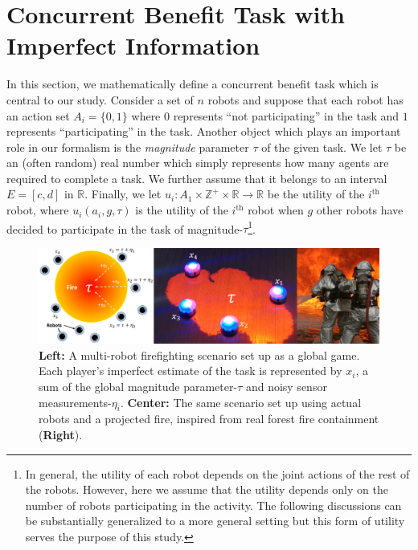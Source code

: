 \documentclass[conference]{ieeeconf}
\def\Z{\mathbb{Z}}
\def\R{\mathbb{R}}
\begin{document}



\section{Concurrent Benefit Task with Imperfect Information}\label{sec:conbenefit}
In this section, we mathematically define a concurrent benefit task which is central to our study. Consider a set of $n$ robots and suppose that each robot has an action set $A_i=\{0,1\}$ where $0$ represents ``not participating'' in the task and $1$ represents ``participating'' in the task.  Another object which plays an important role in our formalism is the \textit{magnitude} parameter $\tau$ of the given task. We let $\tau$ be an (often random) real number which simply represents how many agents are required to complete a task. We further assume that it belongs to an interval $E=[c,d]$ in $\R$.  Finally, we let $u_i:A_1\times\Z^+\times \R\to \R$ be the utility of the $i^{\text{th}}$ robot, where $u_i(a_i,g,\tau)$ is the utility of the $i^{\text{th}}$ robot when $g$ other robots have decided to participate in the task of magnitude-$\tau$\footnote{In general, the utility of each robot depends on the joint actions of the rest of the robots. However, here we assume that the utility depends only on the number of robots participating in the activity. The following discussions can be substantially generalized to a more general setting but this form of utility serves the purpose of this study.}. 

\begin{figure}[!tb]
\centering\includegraphics[width=\textwidth]{../figures/dropletfire.png}
\centering\caption{\textbf{Left:} A multi-robot firefighting scenario set up as a global game. Each player's imperfect estimate of the task is represented by $x_i$, a sum of the global magnitude parameter-$\tau$ and noisy sensor measurements-$\eta_i$. \textbf{Center:} The same scenario set up using actual robots and a projected fire, inspired from real forest fire containment (\textbf{Right}).}\label{fig:ggsetup}
\end{figure}
\end{document}

